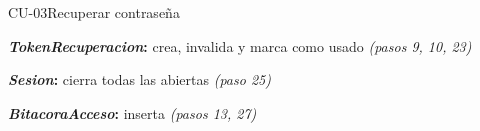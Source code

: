 \begin{fichacu}{CU-03}{Recuperar contraseña}
{\begin{cudatos}
      \item \textbf{\textit{TokenRecuperacion}:} crea, invalida y marca como usado \textit{(pasos 9, 10, 23)}
      \item \textbf{\textit{Sesion}:} cierra todas las abiertas \textit{(paso 25)}
      \item \textbf{\textit{BitacoraAcceso}:} inserta \textit{(pasos 13, 27)}
    \end{cudatos}} \\ \hline
\end{fichacu}
\clearpage
